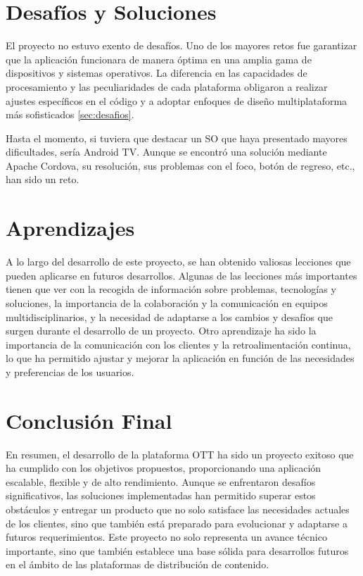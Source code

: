 \section{Desafíos y Soluciones}
\label{sec:conclusiones:desafios}

El proyecto no estuvo exento de desafíos. Uno de los mayores retos fue garantizar que la aplicación funcionara de manera 
óptima en una amplia gama de dispositivos y sistemas operativos. La diferencia en las capacidades de procesamiento y las 
peculiaridades de cada plataforma obligaron a realizar ajustes específicos en el código y a adoptar enfoques de diseño 
multiplataforma más sofisticados \ref{sec:desafios}. 

Hasta el momento, si tuviera que destacar un SO que haya presentado mayores dificultades, sería Android TV. Aunque se encontró
una solución mediante Apache Cordova, su resolución, sus problemas con el foco, botón de regreso, etc., han sido un reto.



\section{Aprendizajes}
\label{sec:conclusiones:mejoras}

A lo largo del desarrollo de este proyecto, se han obtenido valiosas lecciones que pueden aplicarse en futuros desarrollos. 
Algunas de las lecciones más importantes tienen que ver con la recogida de información sobre problemas, tecnologías y
soluciones, la importancia de la colaboración y la comunicación en equipos multidisciplinarios, y la necesidad de adaptarse
a los cambios y desafíos que surgen durante el desarrollo de un proyecto. Otro aprendizaje ha sido la importancia de la
comunicación con los clientes y la retroalimentación continua, lo que ha permitido ajustar y mejorar la aplicación en función
de las necesidades y preferencias de los usuarios.

\section{Conclusión Final}
\label{sec:conclusiones:final}

En resumen, el desarrollo de la plataforma OTT ha sido un proyecto exitoso que ha cumplido con los objetivos propuestos, 
proporcionando una aplicación escalable, flexible y de alto rendimiento. Aunque se enfrentaron desafíos significativos, 
las soluciones implementadas han permitido superar estos obstáculos y entregar un producto que no solo satisface las 
necesidades actuales de los clientes, sino que también está preparado para evolucionar y adaptarse a futuros requerimientos. 
Este proyecto no solo representa un avance técnico importante, sino que también establece una base sólida para desarrollos 
futuros en el ámbito de las plataformas de distribución de contenido.
